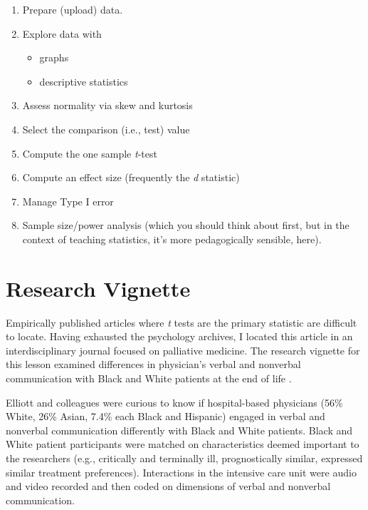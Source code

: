 \documentclass[
  11pt,
]{book}
\providecommand{\tightlist}{%
  \setlength{\itemsep}{0pt}\setlength{\parskip}{0pt}}
\begin{document}
\begin{enumerate}
\def\labelenumi{\arabic{enumi}.}
\tightlist
\item
  Prepare (upload) data.
\item
  Explore data with

  \begin{itemize}
  \tightlist
  \item
    graphs
  \item
    descriptive statistics
  \end{itemize}
\item
  Assess normality via skew and kurtosis
\item
  Select the comparison (i.e., test) value
\item
  Compute the one sample \emph{t}-test
\item
  Compute an effect size (frequently the \emph{d} statistic)
\item
  Manage Type I error
\item
  Sample size/power analysis (which you should think about first, but in the context of teaching statistics, it's more pedagogically sensible, here).
\end{enumerate}

\hypertarget{research-vignette-1}{%
\section{Research Vignette}\label{research-vignette-1}}

Empirically published articles where \emph{t} tests are the primary statistic are difficult to locate. Having exhausted the psychology archives, I located this article in an interdisciplinary journal focused on palliative medicine. The research vignette for this lesson examined differences in physician's verbal and nonverbal communication with Black and White patients at the end of life \citep{elliott_differences_2016}.

Elliott and colleagues \citeyearpar{elliott_differences_2016} were curious to know if hospital-based physicians (56\% White, 26\% Asian, 7.4\% each Black and Hispanic) engaged in verbal and nonverbal communication differently with Black and White patients. Black and White patient participants were matched on characteristics deemed important to the researchers (e.g., critically and terminally ill, prognostically similar, expressed similar treatment preferences). Interactions in the intensive care unit were audio and video recorded and then coded on dimensions of verbal and nonverbal communication.
\end{document}
